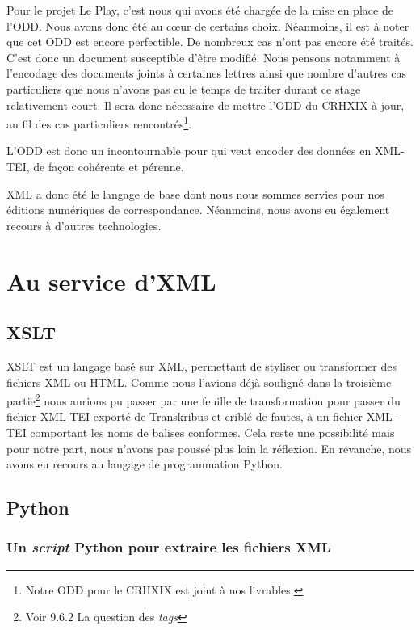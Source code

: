 Pour le projet Le Play, c'est nous qui avons été chargée de la mise en place de l'ODD. Nous avons donc été au c\oe ur de certains choix. Néanmoins, il est à noter que cet ODD est encore perfectible. De nombreux cas n'ont pas encore été traités. C'est donc un document susceptible d'être modifié. Nous pensons notamment à l'encodage des documents joints à certaines lettres ainsi que nombre d'autres cas particuliers que nous n'avons pas eu le temps de traiter durant ce stage relativement court.
Il sera donc nécessaire de mettre l'ODD du CRHXIX à jour, au fil des cas particuliers rencontrés\footnote{Notre ODD pour le CRHXIX est joint à nos livrables.}.

L'ODD est donc un incontournable pour qui veut encoder des données en XML-TEI, de façon cohérente et pérenne.

XML a donc été le langage de base dont nous nous sommes servies pour nos éditions numériques de correspondance. Néanmoins, nous avons eu également recours à d'autres technologies.

\section{Au service d'XML}

\subsection{XSLT}

XSLT est un langage basé sur XML, permettant de styliser ou transformer des fichiers XML ou HTML. Comme nous l'avions déjà souligné dans la troisième partie\footnote{Voir 9.6.2 La question des \emph{tags}} nous aurions pu passer par une feuille de transformation pour passer du fichier XML-TEI exporté de Transkribus et criblé de fautes, à un fichier XML-TEI comportant les noms de balises conformes. Cela reste une possibilité mais pour notre part, nous n'avons pas poussé plus loin la réflexion. En revanche, nous avons eu recours au langage de programmation Python. 

\subsection{Python}

\subsubsection{Un \emph{script} Python pour extraire les fichiers XML}

